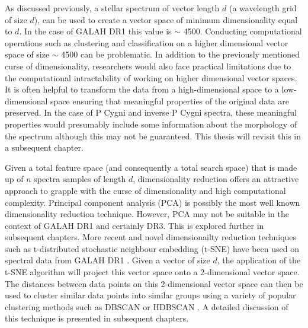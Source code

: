 As discussed previously, a stellar spectrum of vector length $d$ (a wavelength grid of size $d$), can be used to create a vector space of minimum dimensionality equal to $d$. In the case of GALAH DR1 this value is $\sim$ 4500. Conducting computational operations such as clustering and classification on a higher dimensional vector space of size $\sim$ 4500 can be problematic. In addition to the previously mentioned curse of dimensionality, researchers would also face practical limitations due to the computational intractability of working on higher dimensional vector spaces. It is often helpful to transform the data from a high-dimensional space to a low-dimensional space ensuring that meaningful properties of the original data are preserved. In the case of P Cygni and inverse P Cygni spectra, these meaningful properties would presumably include some information about the morphology of the spectrum although this may not be guaranteed. This thesis will revisit this in a subsequent chapter.

Given a total feature space (and consequently a total search space) that is made up of $n$ spectra samples of length $d$, dimensionality reduction offers an attractive approach to grapple with the curse of dimensionality and high computational complexity. Principal component analysis (PCA) is possibly the most well known dimensionality reduction technique. However, PCA may not be suitable in the context of GALAH DR1 and certainly DR3. This is explored further in subsequent chapters. More recent and novel dimensionailty reduction techniques such as t-distributed stochastic neighbour embedding (t-SNE) \cite{van2008visualizing} have been used on spectral data from GALAH DR1 \cite{traven2017galah}. Given a vector of size $d$, the application of the t-SNE algorithm will project this vector space onto a 2-dimensional vector space. The distances between data points on this 2-dimensional vector space can then be used to cluster similar data points into similar groups using a variety of popular clustering methods such as DBSCAN \cite{ester1996density} or HDBSCAN \cite{campello2013density}. A detailed discussion of this technique is presented in subsequent chapters.

